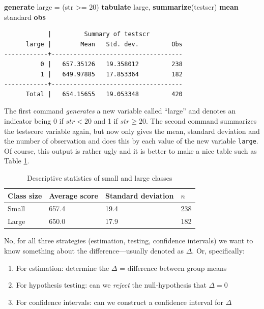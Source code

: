 \documentclass[
]{book}
\newenvironment{Shaded}{\begin{snugshade}}{\end{snugshade}}
\newcommand{\KeywordTok}[1]{\textcolor[rgb]{0.13,0.29,0.53}{\textbf{#1}}}
\newcommand{\NormalTok}[1]{#1}
\providecommand{\tightlist}{%
  \setlength{\itemsep}{0pt}\setlength{\parskip}{0pt}}
\begin{document}
\begin{Shaded}
\begin{Highlighting}[]
\KeywordTok{generate}\NormalTok{ large = (str \textgreater{}= 20)}
\KeywordTok{tabulate}\NormalTok{ large, }\KeywordTok{summarize}\NormalTok{(testscr) }\KeywordTok{mean}\NormalTok{ standard }\KeywordTok{obs}
\end{Highlighting}
\end{Shaded}

\begin{verbatim}
            |         Summary of testscr
      large |        Mean   Std. dev.         Obs
------------+------------------------------------
          0 |   657.35126   19.358012         238
          1 |   649.97885   17.853364         182
------------+------------------------------------
      Total |   654.15655   19.053348         420
\end{verbatim}

The first command \emph{generates} a new variable called ``large'' and denotes an indicator being 0 if \(str < 20\) and 1 if \(str \geq 20\). The second command summarizes the testscore variable again, but now only gives the mean, standard deviation and the number of observation and does this by each value of the new variable \texttt{large}. Of course, this output is rather ugly and it is better to make a nice table such as Table \ref{tab:smalllarge}.

\begin{table}

\caption{\label{tab:smalllarge}Descriptive statistics of small and large classes}
\centering
\begin{tabular}[t]{llll}
\toprule
Class size & Average score & Standard deviation & $n$\\
\midrule
Small & 657.4 & 19.4 & 238\\
Large & 650.0 & 17.9 & 182\\
\bottomrule
\end{tabular}
\end{table}

No, for all three strategies (estimation, testing, confidence intervals) we want to know something about the difference---usually denoted as \(\Delta\). Or, specifically:

\begin{enumerate}
\def\labelenumi{\arabic{enumi}.}
\tightlist
\item
  For estimation: determine the \(\Delta\) = difference between group means
\item
  For hypothesis testing: can we \emph{reject} the null-hypothesis that \(\Delta = 0\)
\item
  For confidence intervals: can we construct a confidence interval for \(\Delta\)
\end{enumerate}
\end{document}
